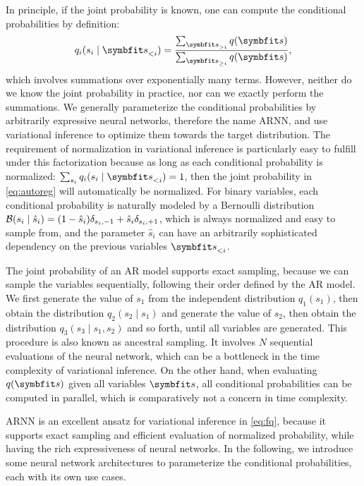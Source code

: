 In principle, if the joint probability is known, one can compute the conditional probabilities by definition:
\begin{equation}
q_i(s_i \mid \vs_{< i}) = \frac{\sum_{\vs_{> i}} q(\vs)}{\sum_{\vs_{\ge i}} q(\vs)},
\end{equation}
which involves summations over exponentially many terms. However, neither do we know the joint probability in practice, nor can we exactly perform the summations. We generally parameterize the conditional probabilities by arbitrarily expressive neural networks, therefore the name ARNN, and use variational inference to optimize them towards the target distribution. The requirement of normalization in variational inference is particularly easy to fulfill under this factorization because as long as each conditional probability is normalized: $\sum_{s_i} q_i(s_i \mid \vs_{< i}) = 1$, then the joint probability in \cref{eq:autoreg} will automatically be normalized. For binary variables, each conditional probability is naturally modeled by a Bernoulli distribution $\mathcal{B}(s_i \mid \hat{s}_i) = (1 - \hat{s}_i) \delta_{s_i, -1} + \hat{s}_i \delta_{s_i, +1}$, which is always normalized and easy to sample from, and the parameter $\hat{s}_i$ can have an arbitrarily sophisticated dependency on the previous variables $\vs_{< i}$.

The joint probability of an AR model supports exact sampling, because we can sample the variables sequentially, following their order defined by the AR model. We first generate the value of $s_1$ from the independent distribution $q_1(s_1)$, then obtain the distribution $q_2(s_2 \mid s_1)$ and generate the value of $s_2$, then obtain the distribution $q_3(s_3 \mid s_1, s_2)$ and so forth, until all variables are generated. This procedure is also known as ancestral sampling. It involves $N$ sequential evaluations of the neural network, which can be a bottleneck in the time complexity of variational inference. On the other hand, when evaluating $q(\vs)$ given all variables $\vs$, all conditional probabilities can be computed in parallel, which is comparatively not a concern in time complexity.

ARNN is an excellent ansatz for variational inference in \cref{eq:fq}, because it supports exact sampling and efficient evaluation of normalized probability, while having the rich expressiveness of neural networks. In the following, we introduce some neural network architectures to parameterize the conditional probabilities, each with its own use cases.

